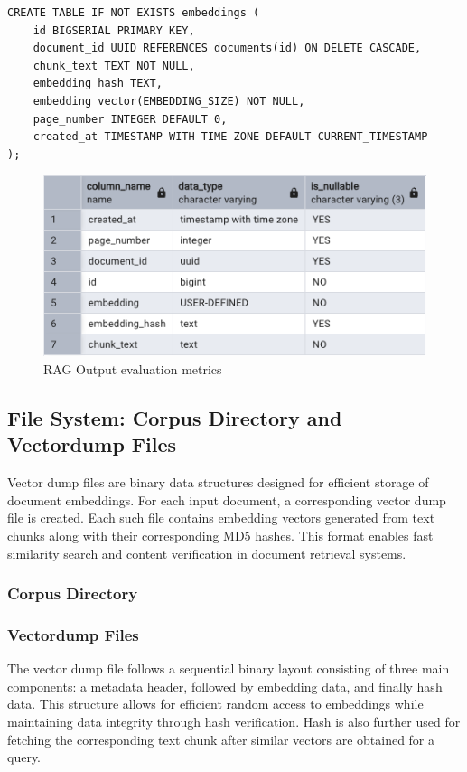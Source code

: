\begin{lstlisting}
CREATE TABLE IF NOT EXISTS embeddings (
    id BIGSERIAL PRIMARY KEY,
    document_id UUID REFERENCES documents(id) ON DELETE CASCADE,
    chunk_text TEXT NOT NULL,
    embedding_hash TEXT,
    embedding vector(EMBEDDING_SIZE) NOT NULL, 
    page_number INTEGER DEFAULT 0,
    created_at TIMESTAMP WITH TIME ZONE DEFAULT CURRENT_TIMESTAMP
);
\end{lstlisting}
\begin{figure}[H]
    \centering
    \includegraphics[width=1.0\linewidth]{images/dbtable-embeddings.png}
    \caption{RAG Output evaluation metrics ~\cite{cardenas2023rag}}
    \label{fig:autoregressive_decoding}
\end{figure}
\subsection{File System: Corpus Directory and Vectordump Files}
\label{subsec:AppDesignModules-FSandVectordump_files}
Vector dump files are binary data structures designed for efficient storage of document embeddings. For each input document, a corresponding vector dump file is created. Each such file contains embedding vectors generated from text chunks along with their corresponding MD5 hashes. This format enables fast similarity search and content verification in document retrieval systems.

\subsubsection{Corpus Directory}
\label{subsec:AppDesignModules-CorpusDir}


\subsubsection{Vectordump Files}
\label{subsec:AppDesignModules-Vectordump_FileStructure}
The vector dump file follows a sequential binary layout consisting of three main components: a metadata header, followed by embedding data, and finally hash data. This structure allows for efficient random access to embeddings while maintaining data integrity through hash verification. Hash is also further used for fetching the corresponding text chunk after similar vectors are obtained for a query.

